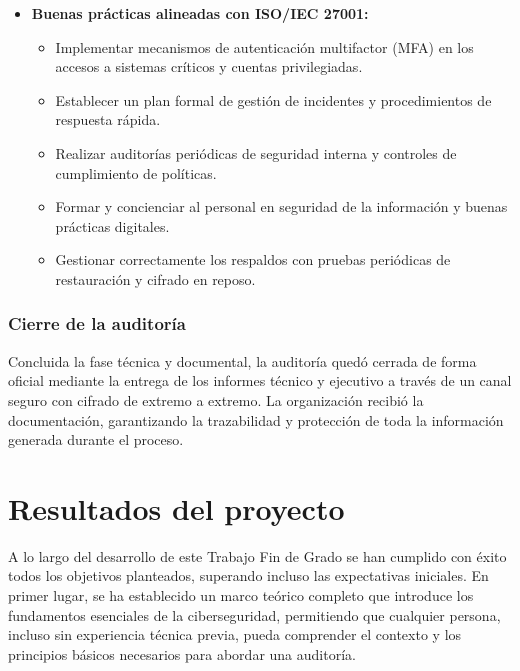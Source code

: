 \documentclass[a4paper, 11pt]{article}
\begin{document}
\begin{itemize}
    \item \textbf{Buenas prácticas alineadas con ISO/IEC 27001:}
    \begin{itemize}
        \item Implementar mecanismos de autenticación multifactor (MFA) en los accesos a sistemas críticos y cuentas privilegiadas.
        \item Establecer un plan formal de gestión de incidentes y procedimientos de respuesta rápida.
        \item Realizar auditorías periódicas de seguridad interna y controles de cumplimiento de políticas.
        \item Formar y concienciar al personal en seguridad de la información y buenas prácticas digitales.
        \item Gestionar correctamente los respaldos con pruebas periódicas de restauración y cifrado en reposo.
    \end{itemize}
\end{itemize}


\subsubsection*{Cierre de la auditoría}

Concluida la fase técnica y documental, la auditoría quedó cerrada de forma oficial mediante la entrega de los informes técnico y ejecutivo a través de un canal seguro con cifrado de extremo a extremo. La organización recibió la documentación, garantizando la trazabilidad y protección de toda la información generada durante el proceso.





\clearpage
\thispagestyle{nohead}

\section{Resultados del proyecto}

A lo largo del desarrollo de este Trabajo Fin de Grado se han cumplido con éxito todos los objetivos planteados, superando incluso las expectativas iniciales. En primer lugar, se ha establecido un marco teórico completo que introduce los fundamentos esenciales de la ciberseguridad, permitiendo que cualquier persona, incluso sin experiencia técnica previa, pueda comprender el contexto y los principios básicos necesarios para abordar una auditoría.
\end{document}
